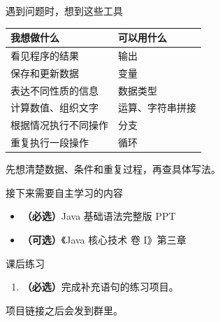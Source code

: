 \documentclass[aspectratio=169]{beamer}
\begin{document}
\begin{frame}{遇到问题时，想到这些工具}
  \begin{center}
    \renewcommand{\arraystretch}{1.4}
    \begin{tabular}{ll}
      \textbf{我想做什么} & \textbf{可以用什么} \\
      \hline
      看见程序的结果 & 输出 \\
      保存和更新数据 & 变量 \\
      表达不同性质的信息 & 数据类型 \\
      计算数值、组织文字 & 运算、字符串拼接 \\
      根据情况执行不同操作 & 分支 \\
      重复执行一段操作 & 循环 \\
    \end{tabular}
  \end{center}
  \bigskip
  \alert{先想清楚数据、条件和重复过程，再查具体写法。}
\end{frame}

\begin{frame}{接下来需要自主学习的内容}
  \begin{itemize}
    \item \textbf{（必选）}Java 基础语法完整版 PPT
      \bigskip
    \item \textbf{（可选）}《Java 核心技术 卷 I》第三章
  \end{itemize}
\end{frame}

\begin{frame}{课后练习}
  \begin{enumerate}
    \item \textbf{（必选）}完成补充语句的练习项目。
  \end{enumerate}
  \bigskip
  项目链接之后会发到群里。
\end{frame}
\end{document}
